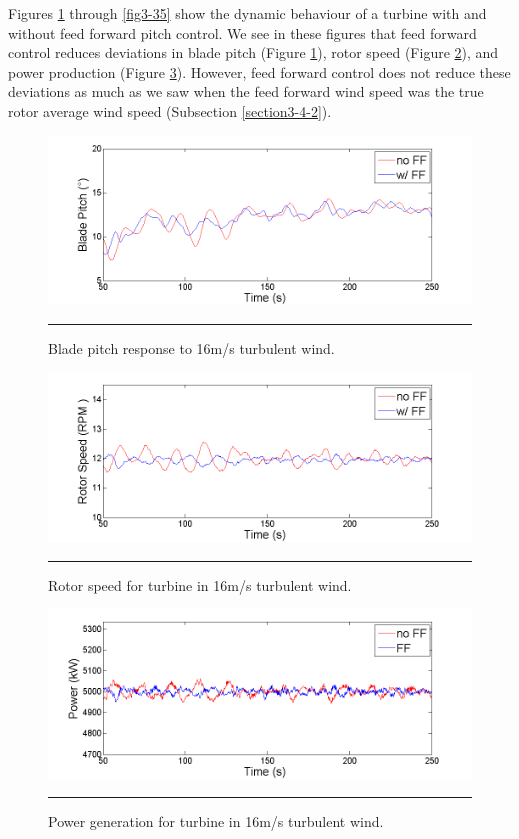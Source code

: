 Figures \ref{fig3-31} through \ref{fig3-35} show the dynamic behaviour of a turbine with and without feed forward pitch control. We see in these figures that feed forward control reduces deviations in blade pitch (Figure \ref{fig3-31}), rotor speed (Figure \ref{fig3-32}), and power production (Figure \ref{fig3-33}). However, feed forward control does not reduce these deviations as much as we saw when the feed forward wind speed was the true rotor average wind speed (Subsection \ref{section3-4-2}). 

\begin{figure}[htbp]
	\centering
		\includegraphics[trim = {1cm 0 2cm 0}, clip, width = \linewidth]{Figures/ch3Figures/fig3-31.png}
		\rule{35em}{0.5pt}
	\caption{Blade pitch response to 16m/s turbulent wind.}
	\label{fig3-31}
\end{figure}

\begin{figure}[htbp]
	\centering
		\includegraphics[trim = {1cm 0 2cm 0}, clip, width = \linewidth]{Figures/ch3Figures/fig3-32.png}
		\rule{35em}{0.5pt}
	\caption{Rotor speed for turbine in 16m/s turbulent wind.}
	\label{fig3-32}
\end{figure}

\begin{figure}[htbp]
	\centering
		\includegraphics[trim = {1cm 0 2cm 0}, clip, width = \linewidth]{Figures/ch3Figures/fig3-33.png}
		\rule{35em}{0.5pt}
	\caption{Power generation for turbine in 16m/s turbulent wind.}
	\label{fig3-33}
\end{figure}

